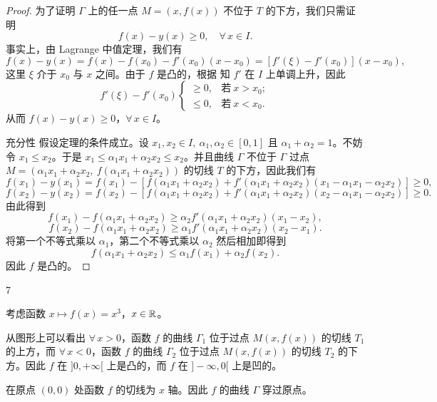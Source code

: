 \begin{proof}
	为了证明 \(\Gamma\) 上的任一点 \(M=(x,f(x))\) 不位于 \(T\) 的下方，我们只需证明
	\[
	f(x)-y(x)\ge0,\quad\forall\,x\in I.
	\]
	事实上，由 Lagrange 中值定理，我们有
	\[
	f(x)-y(x)=f(x)-f(x_0)-f'(x_0)(x-x_0)=[f'(\xi)-f'(x_0)](x-x_0),
	\]
	这里 \(\xi\) 介于 \(x_0\) 与 \(x\) 之间。由于 \(f\) 是凸的，根据 知 \(f'\) 在 \(I\) 上单调上升，因此
	\[
	f'(\xi)-f'(x_0)\begin{cases} \ge0, & \text{若}\ x>x_0; \\ \le0, & \text{若}\ x<x_0. \end{cases}
	\]
	从而 \(f(x)-y(x)\ge0\)，\(\forall\,x\in I\)。

	充分性 假设定理的条件成立。设 \(x_1,x_2\in I,\ \alpha_1,\alpha_2\in[0,1]\) 且 \(\alpha_1+\alpha_2=1\)。不妨令 \(x_1\le x_2\)。于是 \(x_1\le\alpha_1x_1+\alpha_2x_2\le x_2\)。并且曲线 \(\Gamma\) 不位于 \(\Gamma\) 过点 \(M=(\alpha_1x_1+\alpha_2x_2,\ f(\alpha_1x_1+\alpha_2x_2))\) 的切线 \(T\) 的下方，因此我们有
	\[
	f(x_1)-y(x_1)=f(x_1)-[f(\alpha_1x_1+\alpha_2x_2)+f'(\alpha_1x_1+\alpha_2x_2)(x_1-\alpha_1x_1-\alpha_2x_2)]\ge0,
	\]
	\[
	f(x_2)-y(x_2)=f(x_2)-[f(\alpha_1x_1+\alpha_2x_2)+f'(\alpha_1x_1+\alpha_2x_2)(x_2-\alpha_1x_1-\alpha_2x_2)]\ge0.
	\]
	由此得到
	\[
	f(x_1)-f(\alpha_1x_1+\alpha_2x_2)\ge\alpha_2f'(\alpha_1x_1+\alpha_2x_2)(x_1-x_2),
	\]
	\[
	f(x_2)-f(\alpha_1x_1+\alpha_2x_2)\ge\alpha_1f'(\alpha_1x_1+\alpha_2x_2)(x_2-x_1).
	\]
	将第一个不等式乘以 \(\alpha_1\)，第二个不等式乘以 \(\alpha_2\) 然后相加即得到
	\[
	f(\alpha_1x_1+\alpha_2x_2)\le\alpha_1f(x_1)+\alpha_2f(x_2).
	\]
	因此 \(f\) 是凸的。

\end{proof}

\begin{sourceexample}{7}

	考虑函数 \(x\longmapsto f(x)=x^3\)，\(x\in\mathbb{R}\)。

	从图形上可以看出 \(\forall\,x>0\)，函数 \(f\) 的曲线 \(\Gamma_1\) 位于过点 \(M(x,f(x))\) 的切线 \(T_1\) 的上方，而 \(\forall\,x<0\)，函数 \(f\) 的曲线 \(\Gamma_2\) 位于过点 \(M(x,f(x))\) 的切线 \(T_2\) 的下方。因此 \(f\) 在 \(]0,+\infty[\) 上是凸的，而 \(f\) 在 \(]-\infty,0[\) 上是凹的。

	在原点 \((0,0)\) 处函数 \(f\) 的切线为 \(x\) 轴。因此 \(f\) 的曲线 \(\Gamma\) 穿过原点。

	

\end{sourceexample}

